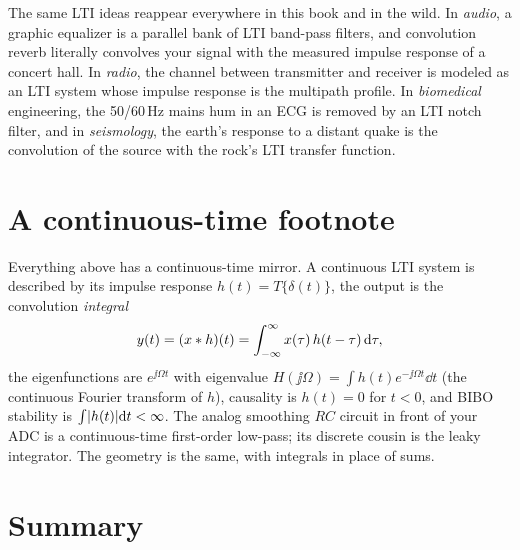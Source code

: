 \begin{applicationbox}
The same LTI ideas reappear everywhere in this book and in the wild. In
\emph{audio}, a graphic equalizer is a parallel bank of LTI band-pass filters,
and convolution reverb literally convolves your signal with the measured
impulse response of a concert hall. In \emph{radio}, the channel between
transmitter and receiver is modeled as an LTI system whose impulse response is
the multipath profile. In \emph{biomedical} engineering, the 50/60\,Hz mains hum in an ECG is
removed by an LTI notch filter, and in \emph{seismology}, the earth's response to a
distant quake is the convolution of the source with the rock's LTI transfer function.
\end{applicationbox}

\section{A continuous-time footnote}
\label{ch12:ct}

Everything above has a continuous-time mirror. A continuous LTI system is
described by its impulse response $h(t)=T\{\delta(t)\}$, the output is the
convolution \emph{integral}
\[
  y(t) = (x\ast h)(t) = \int_{-\infty}^{\infty} x(\tau)\,h(t-\tau)\,\mathrm{d}\tau,
\]
the eigenfunctions are $e^{\jj\Omega t}$ with eigenvalue
$H(\jj\Omega)=\int h(t)e^{-\jj\Omega t}\dd t$ (the continuous Fourier transform of
$h$), causality is $h(t)=0$ for $t<0$, and BIBO stability is
$\int\lvert h(t)\rvert\mathrm{d} t<\infty$. The analog smoothing $RC$ circuit in front of your
ADC is a continuous-time first-order low-pass; its discrete cousin is the leaky
integrator. The geometry is the same, with integrals in place of sums.

\section{Summary}
\label{ch12:summary}

